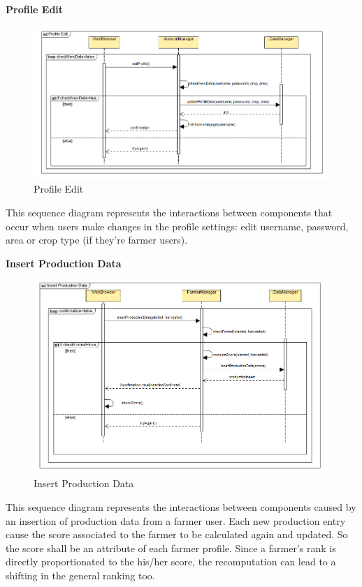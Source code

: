 \documentclass[table, 12pt]{article}
\begin{document}
\newpage
\textbf{Profile Edit}
\begin{center}
    \begin{figure}[H]
        \includegraphics[scale=0.75, center]{assets/SequenceDiagram/ProfileEdit.png}
        \caption{Profile Edit}
        \label{fig: profileEdit}
    \end{figure}
\end{center}
This sequence diagram represents the interactions between components that occur when users make changes in the profile settings: edit username, password, area or crop type (if they're farmer users).

\newpage
\textbf{Insert Production Data}
\begin{center}
    \begin{figure}[H]
        \includegraphics[scale=0.75, center]{assets/SequenceDiagram/InsertProductionData.png}
        \caption{Insert Production Data}
        \label{fig: production}
    \end{figure}
\end{center}
This sequence diagram represents the interactions between components caused by an insertion of production data from a farmer user.
Each new production entry cause the score associated to the farmer to be calculated again and updated. So the score shall be an attribute of each farmer profile. Since a farmer's rank is directly proportionated to the his/her score, the recomputation can lead to a shifting in the general ranking too.
\end{document}
